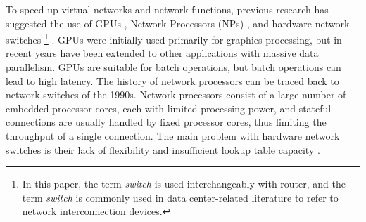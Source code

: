 To speed up virtual networks and network functions, previous research has suggested the use of GPUs \cite{packetshader}, Network Processors (NPs) \cite{cavium,netronome}, and hardware network switches \footnote{In this paper, the term \textit{switch} is used interchangeably with router, and the term \textit{switch} is commonly used in data center-related literature to refer to network interconnection devices.} \cite{duet}. GPUs were initially used primarily for graphics processing, but in recent years have been extended to other applications with massive data parallelism. GPUs are suitable for batch operations, but batch operations can lead to high latency. The history of network processors can be traced back to network switches of the 1990s. Network processors consist of a large number of embedded processor cores, each with limited processing power, and stateful connections are usually handled by fixed processor cores, thus limiting the throughput of a single connection. The main problem with hardware network switches is their lack of flexibility and insufficient lookup table capacity \cite{duet}.


